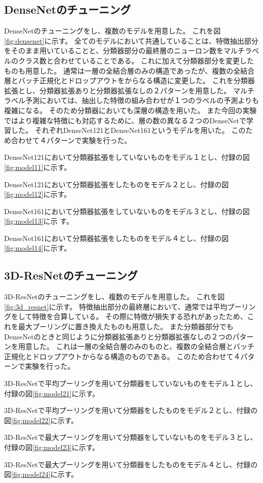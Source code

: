 \subsection{DenseNetのチューニング}
\label{sec:densenet}
DenseNetのチューニングをし、複数のモデルを用意した。
これを図\ref{fig:densenet}に示す。
全てのモデルにおいて共通していることは、特徴抽出部分をそのまま用いていることと、分類器部分の最終層のニューロン数をマルチラベルのクラス数と合わせていることである。
これに加えて分類器部分を変更したものも用意した。
通常は一層の全結合層のみの構造であったが、複数の全結合層とバッチ正規化とドロップアウトをからなる構造に変更した。
これを分類器拡張とし、分類器拡張ありと分類器拡張なしの２パターンを用意した。
マルチラベル予測においては、抽出した特徴の組み合わせが１つのラベルの予測よりも複雑になる。
そのため分類器においても深層の構造を用いた。
また今回の実験ではより複雑な特徴にも対応するために、層の数の異なる２つのDenseNetで学習した。
それぞれDenseNet121\cite{DenseNet}とDenseNet161\cite{DenseNet}というモデルを用いた。
このため合わせて４パターンで実験を行った。

DenseNet121において分類器拡張をしていないものをモデル１とし、付録の図\ref{fig:model11}に示す。

DenseNet121において分類器拡張をしたものをモデル２とし、付録の図\ref{fig:model12}に示す。

DenseNet161において分類器拡張をしていないものをモデル３とし、付録の図\ref{fig:model13}に示
す。

DenseNet161において分類器拡張をしたものをモデル４とし、付録の図\ref{fig:model14}に示す。

\subsection{3D-ResNetのチューニング}
\label{sec:resnet3d}
3D-ResNetのチューニングをし、複数のモデルを用意した。
これを図\ref{fig:3d_resnet}に示す。
特徴抽出部分の最終層において、通常では平均プーリングをして特徴を合算している。
その際に特徴が損失する恐れがあったため、これを最大プーリングに置き換えたものも用意した。
また分類器部分でもDenseNetのときと同じように分類器拡張ありと分類器拡張なしの２つのパターンを用意した。
これは一層の全結合層のみのものと、複数の全結合層とバッチ正規化とドロップアウトからなる構造のものである。
このため合わせて４パターンで実験を行った。

3D-ResNetで平均プーリングを用いて分類器をしていないものをモデル１とし、付録の図\ref{fig:model21}に示す。

3D-ResNetで平均プーリングを用いて分類器をしたものをモデル２とし、付録の図\ref{fig:model22}に示す。

3D-ResNetで最大プーリングを用いて分類器をしていないものをモデル３とし、付録の図\ref{fig:model23}に示す。

3D-ResNetで最大プーリングを用いて分類器をしたものをモデル４とし、付録の図\ref{fig:model24}に示す。
